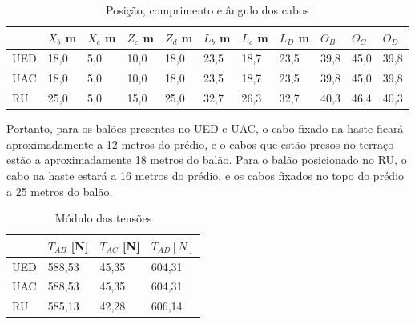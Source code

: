 \begin{table}[H]
\centering
\begin{tabular}{l|l|l|l|l|l|l|l|l|l|l|}
\cline{2-11}
 & $X_{b}$ m & $X_{c}$ m & $Z_{c}$ m & $Z_{d}$ m & $L_{b}$ m & $L_{c}$ m & $L_{D}$ m & $\Theta _{B}$ & $\Theta _{C}$ & $\Theta _{D}$ \\ \hline
\multicolumn{1}{|l|}{UED} & 18,0 & 5,0 & 10,0 & 18,0 & 23,5 & 18,7 & 23,5 & 39,8 & 45,0 & 39,8 \\ \hline
\multicolumn{1}{|l|}{UAC} & 18,0 & 5,0 & 10,0 & 18,0 & 23,5 & 18,7 & 23,5 & 39,8 & 45,0 & 39,8 \\ \hline
\multicolumn{1}{|l|}{RU} & 25,0 & 5,0 & 15,0 & 25,0 & 32,7 & 26,3 & 32,7 & 40,3 & 46,4 & 40,3 \\ \hline
\end{tabular}
\caption{Posição, comprimento e ângulo dos cabos}
\label{tab:composangcabos}
\end{table}

Portanto, para os balões presentes no UED e UAC, o cabo fixado na haste ficará aproximadamente a 12 metros do prédio, e o cabos que estão presos no terraço estão a aproximadamente 18 metros do balão. Para o balão posicionado no RU, o cabo na haste estará a 16 metros do prédio, e os cabos fixados no topo do prédio a 25 metros do balão.

\begin{table}[H]
\centering
\begin{tabular}{l|l|l|l|}
\cline{2-4}
 & $T_{AB}$ [N] & $T_{AC}$ [N] & $T_{AD} [N]$ \\ \hline
\multicolumn{1}{|l|}{UED} & 588,53 & 45,35 & 604,31 \\ \hline
\multicolumn{1}{|l|}{UAC} & 588,53 & 45,35 & 604,31 \\ \hline
\multicolumn{1}{|l|}{RU} & 585,13 & 42,28 & 606,14 \\ \hline
\end{tabular}
\caption{ Módulo das tensões}
\label{table:modTensoes}
\end{table}

